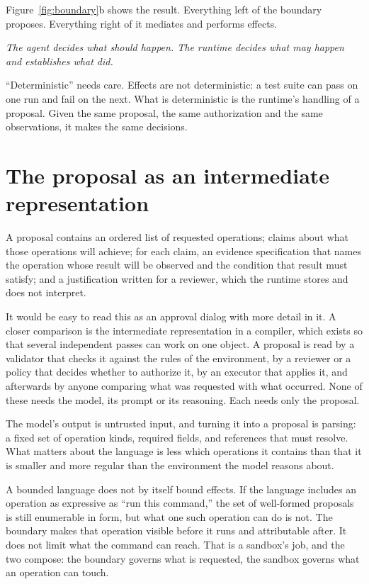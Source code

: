 \documentclass[10pt,letterpaper]{article}
\begin{document}
Figure~\ref{fig:boundary}b shows the result. Everything left of the boundary proposes.
Everything right of it mediates and performs effects.

\begin{keyline}
\itshape The agent decides what should happen. The runtime decides what may happen and
establishes what did.
\end{keyline}

``Deterministic'' needs care. Effects are not deterministic: a test suite can pass on one run
and fail on the next. What is deterministic is the runtime's handling of a proposal. Given the
same proposal, the same authorization and the same observations, it makes the same decisions.

\section{The proposal as an intermediate representation}
\label{sec:ir}

A proposal contains an ordered list of requested operations; claims about what those
operations will achieve; for each claim, an evidence specification that names the operation
whose result will be observed and the condition that result must satisfy; and a justification
written for a reviewer, which the runtime stores and does not interpret.

It would be easy to read this as an approval dialog with more detail in it. A closer
comparison is the intermediate representation in a compiler, which exists so that several
independent passes can work on one object. A proposal is read by a validator that checks it
against the rules of the environment, by a reviewer or a policy that decides whether to
authorize it, by an executor that applies it, and afterwards by anyone comparing what was
requested with what occurred. None of these needs the model, its prompt or its reasoning.
Each needs only the proposal.

The model's output is untrusted input, and turning it into a proposal is parsing: a fixed set
of operation kinds, required fields, and references that must resolve. What matters about the
language is less which operations it contains than that it is smaller and more regular than
the environment the model reasons about.

A bounded language does not by itself bound effects. If the language includes an operation as
expressive as ``run this command,'' the set of well-formed proposals is still enumerable in
form, but what one such operation can do is not. The boundary makes that operation visible
before it runs and attributable after. It does not limit what the command can reach. That is
a sandbox's job, and the two compose: the boundary governs what is requested, the sandbox
governs what an operation can touch.
\end{document}
